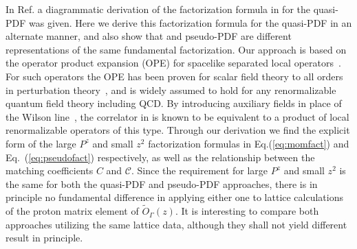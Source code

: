 In Ref.\cite{Ma:2014jla} a diagrammatic derivation of the factorization formula in  for the quasi-PDF was given.  Here we derive this factorization formula for the quasi-PDF in an alternate manner, and also show that \spcorr and pseudo-PDF are different representations of the same
fundamental factorization. Our approach is based on the operator product expansion (OPE) for spacelike separated local operators~\cite{Wilson:1969zs}. For such operators the OPE has been proven for scalar field theory to all orders in perturbation theory~\cite{Brandt:1967rb,Wilson:1972ee,Zimmermann:1972tv}, and is widely assumed to hold for any renormalizable quantum field theory including QCD. By introducing auxiliary fields in place of the Wilson line~\cite{Dorn:1986dt}, the correlator in  is known to be equivalent to a product of local renormalizable operators of this type. Through our derivation we find the explicit form of the large $P^z$ and small $z^2$ factorization formulas in Eq.(\ref{eq:momfact}) and Eq.~(\ref{eq:pseudofact}) respectively, as well as the relationship between the matching coefficients $C$ and $\mathcal{C}$. Since the requirement for large $P^z$ and small $z^2$ is the same for both the quasi-PDF and pseudo-PDF approaches, there is in principle no fundamental difference in applying either one
to lattice calculations of the proton matrix element of $\tilde{O}_{\Gamma}(z)$. It is interesting to compare
both approaches utilizing the same lattice data, although they shall not yield different result in principle.

